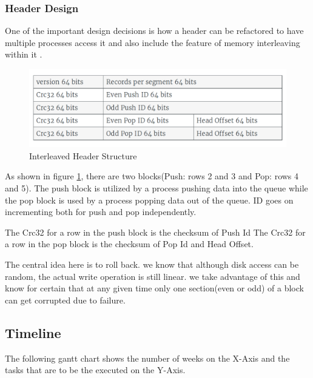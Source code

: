 \documentclass[12pt,a4paper]{article}
\begin{document}
  
  
  \subsubsection{Header Design}
  One of the important design decisions is how a header can be refactored to have multiple processes access it and also include the feature of memory interleaving within it \citep{burnett1970study}.
 
  \begin{figure}[!htb]
  	\centering
  	\textbf{}\par\medskip
  	\includegraphics[scale=0.4]{6}
  	\caption{Interleaved Header Structure}
  	\label{fig:gdull06}
  \end{figure}
  
  As shown in figure \ref{fig:gdull06}, there are two blocks(Push: rows 2 and 3 and Pop: rows 4 and 5). The push block is utilized by a process pushing data into the queue while the pop block is used by a process popping data out of the queue. ID goes on incrementing both for push and pop independently.
  
  The Crc32 for a row in the push block is the checksum of Push Id
  The Crc32 for a row in the pop block is the checksum of Pop Id and Head Offset.
  
  The central idea here is to roll back. we know that although disk access can be random, the actual write operation is still linear. we take advantage of this and know for certain that at any given time only one section(even or odd) of a block can get corrupted due to failure.
 
 
 \subsection{Timeline}
 
 The following gantt chart shows the number of weeks on the X-Axis and the tasks that are to be the executed on the Y-Axis.
 
 \begin{gantt}{11}{12}
 \begin{ganttitle}
 \end{ganttitle}
 \end{gantt}
\end{document}
